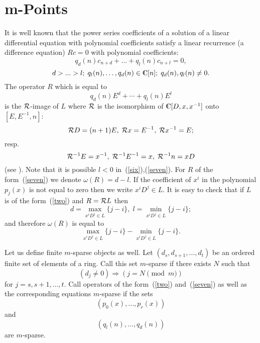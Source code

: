 \section{m-Points}
It is well known that the power series coefficients of a solution
of a linear differential equation with polynomial coefficients
satisfy a linear recurrence (a difference equation) $Rc=0$
with polynomial coefficients:
\begin{equation}
\label{six}
q_d(n)c_{n+d}+\dots+q_l(n)c_{n+l}=0,
\end{equation}
$$
d>...>l;\; q_l(n),\dots,q_d(n) \in \complex[n];\; q_d(n),q_l(n)\ne 0.
$$
The operator $R$ which is equal to
\begin{equation}
\label{seven}
q_d(n)E^d+\cdots+q_l(n)E^l
\end{equation}
is the ${\cal R}$-image of $L$ where ${\cal R}$ is the isomorphism of
$\complex[D,x,x^{-1}]$ onto \complex$[E,E^{-1},n]$:
\begin{equation}
\label{eight}
{\cal R}D=(n+1)E,\; {\cal R}x = E^{-1},\; {\cal R}x^{-1} = E ;
\end{equation}
resp.
$$
{\cal R}^{-1}E=x^{-1},\; {\cal R}^{-1}E^{-1}=x, \;{\cal R}^{-1}n = xD
$$
(see \cite{APR}). Note that it is possible
$l<0$ in~(\ref{six}),(\ref{seven}).
For $R$ of the form~(\ref{seven}) we denote $\omega (R)=d-l$.
If the coefficient of $x^i$ in the polynomial $p_j(x)$
is not equal to zero then we write $x^iD^j \in L$.
It is easy to check that if $L$ is of the form~(\ref{two})
and $R={\cal R}L$ then
\begin{equation}
\label{23}
d=\max_{x^iD^j\in L} \{j-i\},\; l=\min_{x^iD^j\in L} \{j-i\} ;
\end{equation}
and therefore $\omega (R)$ is equal to
\begin{equation}
\label{nine}
\max_{x^iD^j\in L} \{j-i\}- \min_{x^iD^j\in L} \{j-i\}.
\end{equation}

Let us define finite $m$-sparse objects as well.
Let $(d_s,d_{s+1},\dots,d_t)$ be an ordered finite set of elements of a ring.
Call this set $m$-sparse if there exists $N$ such that
$$
(d_j \neq 0) \Rightarrow (j = N \pmod{m})
$$
for $j=s,s+1,\dots,t$. Call operators of the form~(\ref{two})
and~(\ref{seven}) as well as the corresponding equations  $m$-sparse
if the sets
$$
(p_0(x),\dots,p_r(x))
$$
and
$$
(q_l(n),\dots,q_d(n))
$$
are $m$-sparse.

